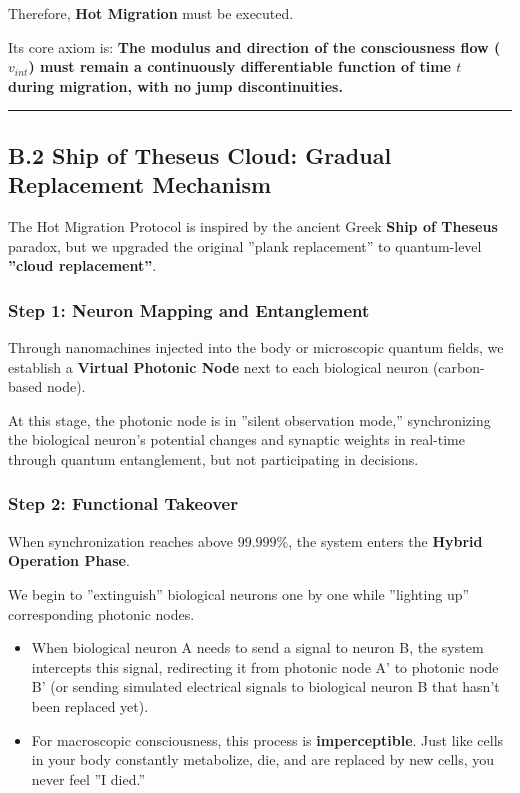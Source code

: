 Therefore, \textbf{Hot Migration} must be executed.

Its core axiom is: \textbf{The modulus and direction of the consciousness flow ($v_{int}$) must remain a continuously differentiable function of time $t$ during migration, with no jump discontinuities.}

\hrule

\subsection{B.2 Ship of Theseus Cloud: Gradual Replacement Mechanism}

The Hot Migration Protocol is inspired by the ancient Greek \textbf{Ship of Theseus} paradox, but we upgraded the original ''plank replacement'' to quantum-level \textbf{''cloud replacement''}.

\subsubsection{Step 1: Neuron Mapping and Entanglement}

Through nanomachines injected into the body or microscopic quantum fields, we establish a \textbf{Virtual Photonic Node} next to each biological neuron (carbon-based node).

At this stage, the photonic node is in ''silent observation mode,'' synchronizing the biological neuron's potential changes and synaptic weights in real-time through quantum entanglement, but not participating in decisions.

\subsubsection{Step 2: Functional Takeover}

When synchronization reaches above $99.999\%$, the system enters the \textbf{Hybrid Operation Phase}.

We begin to ''extinguish'' biological neurons one by one while ''lighting up'' corresponding photonic nodes.

\begin{itemize}
\item When biological neuron A needs to send a signal to neuron B, the system intercepts this signal, redirecting it from photonic node A' to photonic node B' (or sending simulated electrical signals to biological neuron B that hasn't been replaced yet).

\item For macroscopic consciousness, this process is \textbf{imperceptible}. Just like cells in your body constantly metabolize, die, and are replaced by new cells, you never feel ''I died.''
\end{itemize}

